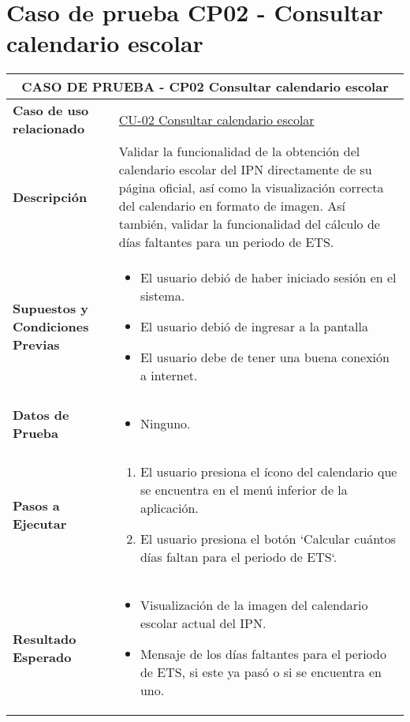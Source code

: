 
\section{Caso de prueba CP02 - Consultar calendario escolar}

\begin{longtable}{|p{5cm}|p{10cm}|}
	\hline
	\multicolumn{2}{|c|}{\textbf{CASO DE PRUEBA - CP02 Consultar calendario escolar}} \\
	\hline
	\textbf{Caso de uso relacionado} & \hyperref[CU-02]{CU-02 Consultar calendario escolar} \\
	\hline
	\textbf{Descripción} & Validar la funcionalidad de la obtención del calendario escolar del IPN directamente de su página oficial, así como la visualización correcta del calendario en formato de imagen. Así también, validar la funcionalidad del cálculo de días faltantes para un periodo de ETS. \\
	\hline
	\textbf{Supuestos y Condiciones Previas} & 
	\begin{itemize}
		\item El usuario debió de haber iniciado sesión en el sistema.
		\item El usuario debió de ingresar a la pantalla \IUref{IU02}{Pantalla Consultar calendario escolar}
		\item El usuario debe de tener una buena conexión a internet.
	\end{itemize} \\
	\hline
	\textbf{Datos de Prueba} & 
	\begin{itemize}
		\item Ninguno.
	\end{itemize} \\
	\hline
	\textbf{Pasos a Ejecutar} & 
	\begin{enumerate}
		\item El usuario presiona el ícono del calendario que se encuentra en el menú inferior de la aplicación.
		\item El usuario presiona el botón `Calcular cuántos días faltan para el periodo de ETS`.
	\end{enumerate} \\
	\hline
	\textbf{Resultado Esperado} & 
	\begin{itemize}
		\item Visualización de la imagen del calendario escolar actual del IPN. 
		\item Mensaje de los días faltantes para el periodo de ETS, si este ya pasó o si se encuentra en uno.

\end{itemize}
\end{longtable}
